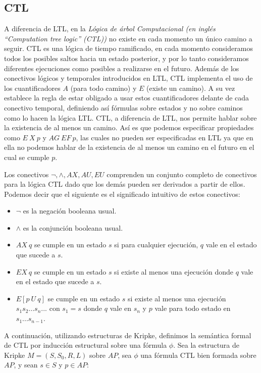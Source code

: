 \documentclass[titlepage, 12pt]{book}
\begin{document}
\subsection*{CTL}
A diferencia de LTL, en la \textit{L\'ogica de \'arbol Computacional (en ingl\'es ``Computation tree logic'' (CTL))}  no existe en cada momento un \'unico camino a seguir. CTL es una l\'ogica de tiempo ramificado, en cada momento consideramos todos los posibles saltos hacia un estado posterior, y por lo tanto consideramos diferentes ejecuciones como posibles a realizarse en el futuro. Adem\'as de los conectivos l\'ogicos y temporales introducidos en LTL, CTL implementa el uso de los cuantificadores $A$ (para todo camino) y $E$ (existe un camino). A su vez establece la regla de estar obligado a usar estos cuantificadores delante de cada conectivo temporal, definiendo as\'i f\'ormulas sobre estados y no sobre caminos como lo hacen la l\'ogica LTL. CTL, a diferencia de LTL, nos permite hablar sobre la existencia de al menos un camino. As\'i es que podemos especificar propiedades como  $E~X~p$ y $AG~EF~p$, las cuales no pueden ser especificadas en LTL ya que en ella no podemos hablar de la existencia de al menos un camino en el futuro en el cual se cumple $p$.

Los conectivos ${\neg,\wedge,AX,AU,EU}$ comprenden un conjunto completo de conectivos para la l\'ogica CTL dado que los dem\'as pueden ser derivados a partir de ellos. Podemos decir que el siguiente es el significado intuitivo de estos conectivos:

\begin{itemize}
\item $\neg$ es la negaci\'on booleana usual.
\item $\wedge$ es la conjunci\'on booleana usual.
\item $AX~q$ se cumple en un estado $s$ si para cualquier ejecuci\'on, $q$ vale en el estado que sucede a $s$.
\item $EX~q$ se cumple en un estado $s$ si existe al menos una ejecuci\'on donde $q$ vale en el estado que sucede a $s$.
\item $E[p~U~q]$ se cumple en un estado $s$ si existe al menos una ejecuci\'on $s_1s_2...s_n...$ con $s_1 = s$ donde $q$ vale en $s_n$ y $p$ vale para todo estado en $s_1...s_{n-1}$.
\end{itemize}

A continuaci\'on, utilizando estructuras de Kripke, definimos la sem\'antica formal de CTL por inducci\'on estructural sobre una f\'ormula $\phi$. Sea la estructura de Kripke $M =(S,S_0,R,L)$ sobre $AP$, sea $\phi$ una f\'ormula CTL bien formada sobre $AP$, y sean $s \in S$ y $p \in AP$:\\
\end{document}
